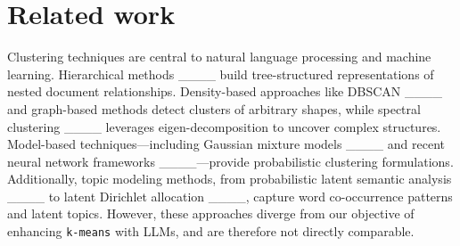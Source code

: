 \section{Related work}
Clustering techniques are central to natural language processing and machine learning. Hierarchical methods ____ build tree-structured representations of nested document relationships. Density-based approaches like DBSCAN ____ and graph-based methods detect clusters of arbitrary shapes, while spectral clustering ____ leverages eigen-decomposition to uncover complex structures. Model-based techniques—including Gaussian mixture models ____ and recent neural network frameworks ____—provide probabilistic clustering formulations. Additionally, topic modeling methods, from probabilistic latent semantic analysis ____ to latent Dirichlet allocation ____, capture word co-occurrence patterns and latent topics. However, these approaches diverge from our objective of enhancing \texttt{k-means} with LLMs, and are therefore not directly comparable.

